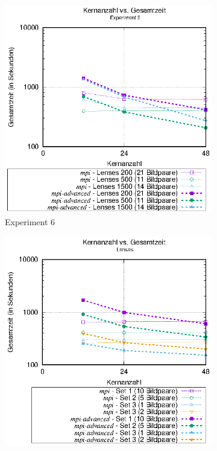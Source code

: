 \begin{center}
	\begin{figure}[htbp]
		\begin{subfigure}[b]{0.45\textwidth}
			\centering
			\includegraphics[width=\textwidth]{pdf/mpi_advanced_times_exp6}
			\caption{Experiment 6}
			\label{fig:mpi_advanced_times_exp6}
		\end{subfigure}
		\hfill
		\begin{subfigure}[b]{0.45\textwidth}
			\centering
			\includegraphics[width=\textwidth]{pdf/mpi_advanced_times_lenses}

\end{subfigure}
\end{figure}
\end{center}
